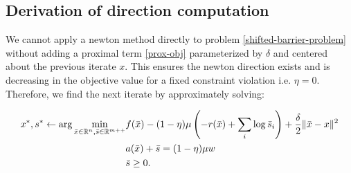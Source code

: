 \documentclass{article}
\begin{document}

\subsection{Derivation of direction computation}\label{sub:direction-computation}

We cannot apply a newton method directly to problem \eqref{shifted-barrier-problem} without adding a proximal term \eqref{prox-obj} parameterized by $\delta$ and centered about the previous iterate $x$. This ensures the newton direction exists and is decreasing in the objective value for a fixed constraint violation i.e. $\eta = 0$. Therefore, we find the next iterate by approximately solving:

\begin{subequations}\label{sophisticated-barrier-problem}
\begin{flalign}
x^{*}, s^{*} \gets \arg \min_{\bar{x} \in \mathbb{R}^{n}, \bar{s} \in \mathbb{R}^{m++}} & f(\bar{x}) -(1 - \eta) \mu \left( -r( \bar{x} ) + \sum_i{ \log{\bar{s}_i} } \right)  + \frac{\delta}{2} \| \bar{x} - x \|^2 \label{prox-obj} \\
& a(\bar{x}) + \bar{s} = (1 - \eta) \mu w \\
& \bar{s} \ge 0.
\end{flalign}
\end{subequations}
\end{document}
